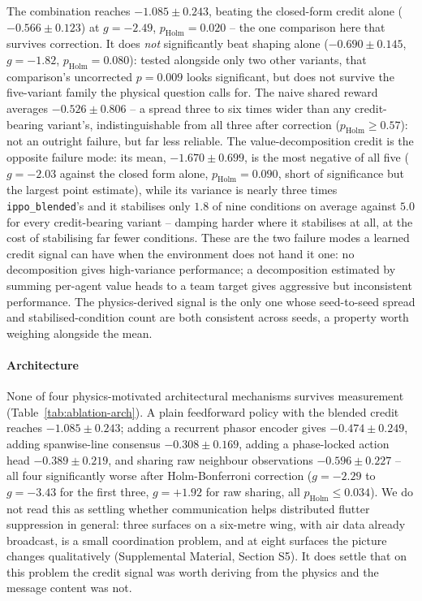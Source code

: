 \documentclass[preprint,11pt]{elsarticle}
\begin{document}
\begin{table}[t]
\centering
\caption{Credit-assignment ablation at $\sigma=0.05$, six seeds per
variant. All ten pairwise $p$-values are Holm-Bonferroni corrected across
this family.}
\label{tab:ablation-credit}
\small

\end{table}

The combination reaches $-1.085 \pm 0.243$, beating the closed-form credit
alone ($-0.566\pm0.123$) at $g=-2.49$, $p_{\mathrm{Holm}}=0.020$ -- the one
comparison here that survives correction. It does \emph{not} significantly
beat shaping alone ($-0.690\pm0.145$, $g=-1.82$, $p_{\mathrm{Holm}}=0.080$):
tested alongside only two other variants, that comparison's uncorrected
$p=0.009$ looks significant, but does not survive the five-variant family
the physical question calls for. The naive shared reward averages
$-0.526\pm0.806$ -- a spread three to six times wider than any
credit-bearing variant's, indistinguishable from all three after
correction ($p_{\mathrm{Holm}}\ge0.57$): not an outright failure, but far
less reliable. The value-decomposition credit is the opposite failure
mode: its mean, $-1.670\pm0.699$, is the most negative of all five
($g=-2.03$ against the closed form alone, $p_{\mathrm{Holm}}=0.090$, short
of significance but the largest point estimate), while its variance is
nearly three times \texttt{ippo\_blended}'s and it stabilises only $1.8$ of
nine conditions on average against $5.0$ for every credit-bearing variant
-- damping harder where it stabilises at all, at the cost of stabilising
far fewer conditions. These are the two failure modes a learned credit
signal can have when the environment does not hand it one: no
decomposition gives high-variance performance; a decomposition estimated
by summing per-agent value heads to a team target gives aggressive but
inconsistent performance. The physics-derived signal is the only one whose
seed-to-seed spread and stabilised-condition count are both consistent
across seeds, a property worth weighing alongside the mean.

\paragraph{Architecture}
None of four physics-motivated architectural mechanisms survives
measurement (Table~\ref{tab:ablation-arch}). A plain feedforward policy
with the blended credit reaches $-1.085\pm0.243$; adding a recurrent
phasor encoder gives $-0.474\pm0.249$, adding spanwise-line consensus
$-0.308\pm0.169$, adding a phase-locked action head $-0.389\pm0.219$, and
sharing raw neighbour observations $-0.596\pm0.227$ -- all four
significantly worse after Holm-Bonferroni correction ($g=-2.29$ to
$g=-3.43$ for the first three, $g=+1.92$ for raw sharing, all
$p_{\mathrm{Holm}}\le0.034$). We do not read this as settling whether
communication helps distributed flutter suppression in general: three
surfaces on a six-metre wing, with air data already broadcast, is a small
coordination problem, and at eight surfaces the picture changes
qualitatively (Supplemental Material, Section S5). It does settle that on
this problem the credit signal was worth deriving from the physics and the
message content was not.
\end{document}
